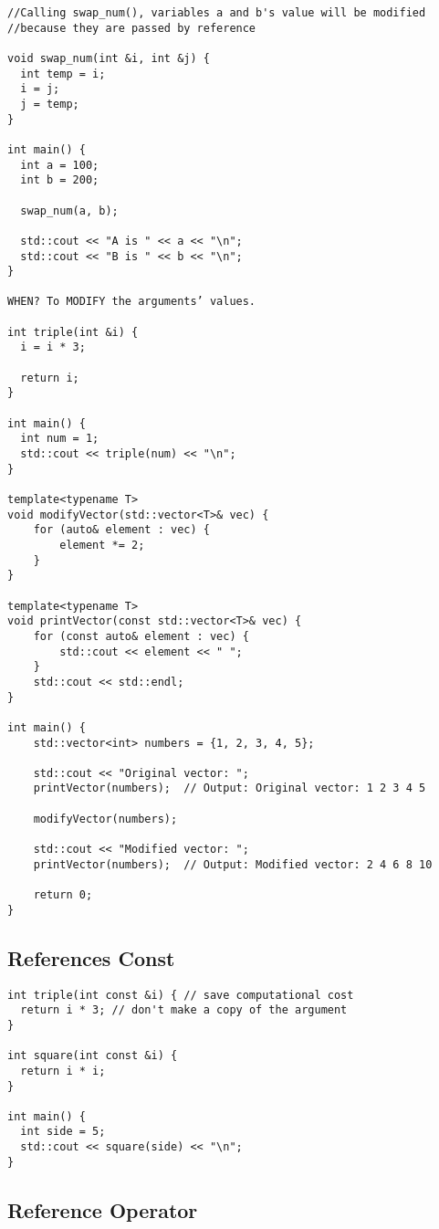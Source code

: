 \begin{verbatim}
//Calling swap_num(), variables a and b's value will be modified
//because they are passed by reference

void swap_num(int &i, int &j) {
  int temp = i;
  i = j;
  j = temp;
}
 
int main() {
  int a = 100;
  int b = 200;
 
  swap_num(a, b);
 
  std::cout << "A is " << a << "\n";
  std::cout << "B is " << b << "\n";
}

WHEN? To MODIFY the arguments’ values.

int triple(int &i) {
  i = i * 3;
  
  return i;
}

int main() {
  int num = 1;
  std::cout << triple(num) << "\n";
}

template<typename T>
void modifyVector(std::vector<T>& vec) {
    for (auto& element : vec) {
        element *= 2;
    }
}

template<typename T>
void printVector(const std::vector<T>& vec) {
    for (const auto& element : vec) {
        std::cout << element << " ";
    }
    std::cout << std::endl;
}

int main() {
    std::vector<int> numbers = {1, 2, 3, 4, 5};

    std::cout << "Original vector: ";
    printVector(numbers);  // Output: Original vector: 1 2 3 4 5

    modifyVector(numbers);

    std::cout << "Modified vector: ";
    printVector(numbers);  // Output: Modified vector: 2 4 6 8 10

    return 0;
}
\end{verbatim}

\subsection{References Const}

\begin{verbatim}
int triple(int const &i) { // save computational cost
  return i * 3; // don't make a copy of the argument
}

int square(int const &i) {
  return i * i;
}

int main() {
  int side = 5;
  std::cout << square(side) << "\n";
}
\end{verbatim}

\subsection{Reference Operator}

